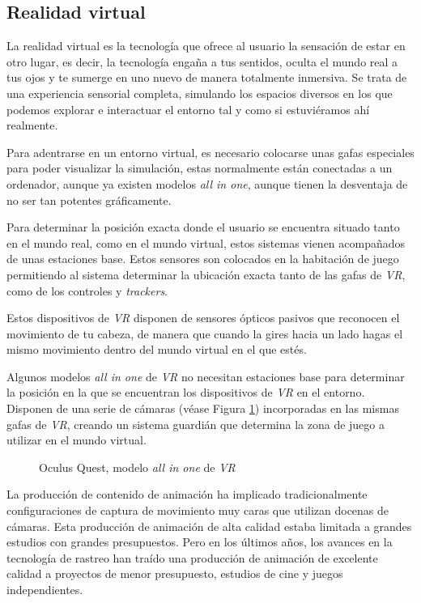 \subsection{Realidad virtual}

La realidad virtual es la tecnología que ofrece al usuario la sensación de estar en otro lugar, es decir, la tecnología engaña a tus sentidos, oculta el mundo real a tus ojos y te sumerge en uno nuevo de manera totalmente inmersiva. Se trata de una experiencia sensorial completa, simulando los espacios diversos en los que podemos explorar e interactuar el entorno tal y como si estuviéramos ahí realmente.

Para adentrarse en un entorno virtual, es necesario colocarse unas gafas especiales para poder visualizar la simulación, estas normalmente están conectadas a un ordenador, aunque ya existen modelos \textit{all in one}, aunque tienen la desventaja de no ser tan potentes gráficamente. 

Para determinar la posición exacta donde el usuario se encuentra situado tanto en el mundo real, como en el mundo virtual, estos sistemas vienen acompañados de unas estaciones base. Estos sensores son colocados en la habitación de juego permitiendo al sistema determinar la ubicación exacta tanto de las gafas de \textit{VR}, como de los controles y \textit{trackers}. 

Estos dispositivos de \textit{VR} disponen de sensores ópticos pasivos que reconocen el movimiento de tu cabeza, de manera que cuando la gires hacia un lado hagas el mismo movimiento dentro del mundo virtual en el que estés. 

Algunos modelos \textit{all in one} de \textit{VR} no necesitan estaciones base para determinar la posición en la que se encuentran los dispositivos de \textit{VR} en el entorno. Disponen de una serie de cámaras (véase Figura \ref{fig:Quest}) incorporadas en las mismas gafas de \textit{VR}, creando un sistema guardián que determina la zona de juego a utilizar en el mundo virtual.

\begin{figure}[h!]
    \centering
    \caption{Oculus Quest, modelo \textit{all in one} de \textit{VR}}
    \label{fig:Quest}  
\end{figure}

La producción de contenido de animación ha implicado tradicionalmente configuraciones de captura de movimiento muy caras que utilizan docenas de cámaras. Esta producción de animación de alta calidad estaba limitada a grandes estudios con grandes presupuestos. Pero en los últimos años, los avances en la tecnología de rastreo han traído una producción de animación de excelente calidad a proyectos de menor presupuesto, estudios de cine y juegos independientes. \cite{Vive}

